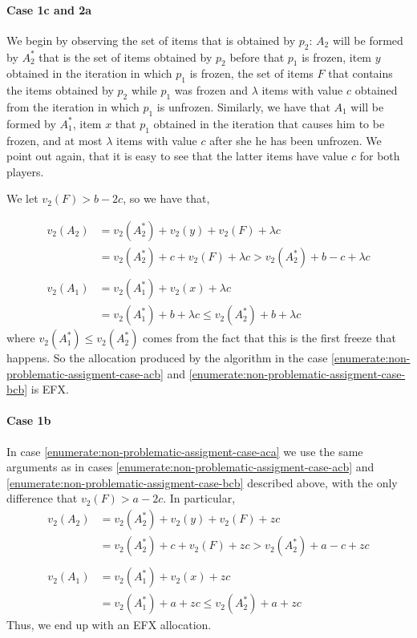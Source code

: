 \paragraph{Case 1c and 2a}
We begin by observing the set of items that is obtained by $p_2$: $A_2$ will be formed by $A_2^*$ that is the set of items obtained by $p_2$ before that $p_1$ is frozen, item $y$ obtained in the iteration in which $p_1$ is frozen, the set of items $F$ that contains the items obtained by $p_2$ while $p_1$ was frozen and $\lambda$ items with value $c$ obtained from the iteration in which $p_1$ is unfrozen. Similarly, we have that $A_1$ will be formed by $A_1^*$, item $x$ that $p_1$ obtained in the iteration that causes him to be frozen, and at most $\lambda$ items with value $c$ after she he has been unfrozen. We point out again, that it is easy to see that the latter items have value $c$ for both players.

We let $v_2(F) > b-2c$, so we have that, 

\begin{align*}
    v_2(A_2) &= v_2(A_2^*) + v_2(y) + v_2(F) + \lambda c\\
    &= v_2(A_2^*) + c + v_2(F) + \lambda c > v_2(A_2^*) + b-c + \lambda c\\
    \\
    v_2(A_1) &= v_2(A_1^*) + v_2(x) + \lambda c\\
    &=v_2(A_1^*) + b + \lambda c\le v_2(A_2^*) + b + \lambda c
\end{align*} 
where $v_2(A_1^*)\le v_2(A_2^*)$ comes from the fact that this is the first freeze that happens.
So the allocation produced by the algorithm in the case \ref{enumerate:non-problematic-assigment-case-acb} and \ref{enumerate:non-problematic-assigment-case-bcb} is EFX.

\paragraph{Case 1b}
In case  \ref{enumerate:non-problematic-assigment-case-aca} we use the same arguments as in cases \ref{enumerate:non-problematic-assigment-case-acb} and \ref{enumerate:non-problematic-assigment-case-bcb} described above, with the only difference that $v_2(F) > a-2c$. In particular,
\begin{align*}
    v_2(A_2) &= v_2(A_2^*) + v_2(y) + v_2(F) + zc\\
    &= v_2(A_2^*) + c + v_2(F) + zc > v_2(A_2^*) + a-c + zc\\\\
    v_2(A_1) &= v_2(A_1^*) + v_2(x) + zc\\
    &=v_2(A_1^*) + a + zc\le v_2(A_2^*) + a + zc
\end{align*}
Thus, we end up with an EFX allocation.

